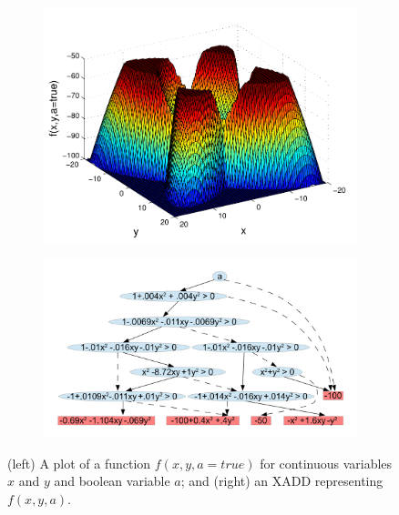 \begin{figure}[!htb]
    \centering
    \begin{subfigure}[b]{0.23\textwidth}
        \includegraphics[width=1.0\linewidth]{images/quad2.pdf}
    \end{subfigure}
    \begin{subfigure}[b]{0.23\textwidth}
        \includegraphics[width=0.88\linewidth, height=1.1\linewidth]{images/quad2_xadd5.pdf}
    \end{subfigure}    
    \caption{(left) A plot of a function $f(x, y, a=\mathit{true})$ for continuous variables $x$ and $y$ and boolean variable $a$; and (right) an XADD representing $f(x,y,a)$.}
    \label{fig:xadd}
\end{figure}

